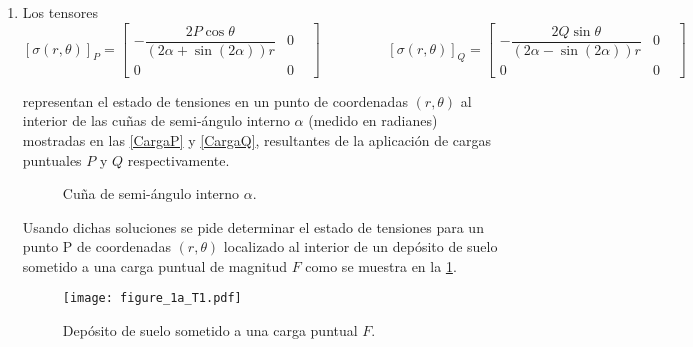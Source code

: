 \documentclass[../notas medios.tex]{subfiles}
\begin{document}
\begin{enumerate}
\item \label{punto23}  Los tensores
\[[\sigma(r,{\theta})]_P
 	= 
 	\begin{bmatrix}
     	-\dfrac{2P\cos\theta}{(2\alpha + \sin(2\alpha)) r} & 0 \;\;\;\\
     	0 & 0 \;\;\;
 	\end{bmatrix}
 	\hspace{2cm}
	[\sigma(r,{\theta})]_Q
 	= 
  	\begin{bmatrix}
     	-\dfrac{2Q\sin\theta}{(2\alpha - \sin(2\alpha)) r} & 0 \;\;\; \\
     	0 & 0 \;\;\;
 	\end{bmatrix}\]
 	
representan el estado de tensiones en un punto de coordenadas $(r, \theta)$ al interior de las cuñas de semi-ángulo interno $\alpha$ (medido en radianes) mostradas en las \cref{CargaP} y \cref{CargaQ}, resultantes de la aplicación de cargas puntuales $P$ y $Q$ respectivamente. 

%


%
\begin{figure}[H]
	\centering	
	\hspace{1.5cm}
	\caption{Cuña de semi-ángulo interno $\alpha$. }
\end{figure}

Usando dichas soluciones se pide determinar el estado de tensiones para un punto P de coordenadas $(r, \theta)$ localizado al interior de un depósito de suelo sometido a una carga puntual de magnitud $F$ como se muestra en la \cref{figure1}. 
%
\begin{figure}[h]
	\centering
		\texttt{[image: figure\_1a\_T1.pdf]} 		
	\caption{Depósito de suelo sometido a una carga puntual $F$.}
	\label{figure1}
\end{figure}
\end{enumerate}
\end{document}
